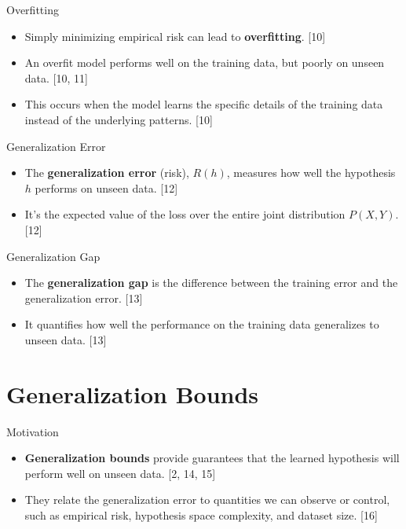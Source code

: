 \documentclass[
  ignorenonframetext,
]{beamer}
\providecommand{\tightlist}{%
  \setlength{\itemsep}{0pt}\setlength{\parskip}{0pt}}\usepackage{longtable,booktabs,array}
\begin{document}
\begin{frame}{Overfitting}
\label{overfitting}
\begin{itemize}
\tightlist
\item
  Simply minimizing empirical risk can lead to \textbf{overfitting}.
  {[}10{]}
\item
  An overfit model performs well on the training data, but poorly on
  unseen data. {[}10, 11{]}
\item
  This occurs when the model learns the specific details of the training
  data instead of the underlying patterns. {[}10{]}
\end{itemize}
\end{frame}

\begin{frame}{Generalization Error}
\label{generalization-error}
\begin{itemize}
\tightlist
\item
  The \textbf{generalization error} (risk), \(R(h)\), measures how well
  the hypothesis \(h\) performs on unseen data. {[}12{]}
\item
  It's the expected value of the loss over the entire joint distribution
  \(P(X,Y)\). {[}12{]}
\end{itemize}
\end{frame}

\begin{frame}{Generalization Gap}
\label{generalization-gap}
\begin{itemize}
\tightlist
\item
  The \textbf{generalization gap} is the difference between the training
  error and the generalization error. {[}13{]}
\item
  It quantifies how well the performance on the training data
  generalizes to unseen data. {[}13{]}
\end{itemize}
\end{frame}

\section{Generalization Bounds}\label{generalization-bounds}

\begin{frame}{Motivation}
\label{motivation}
\begin{itemize}
\tightlist
\item
  \textbf{Generalization bounds} provide guarantees that the learned
  hypothesis will perform well on unseen data. {[}2, 14, 15{]}
\item
  They relate the generalization error to quantities we can observe or
  control, such as empirical risk, hypothesis space complexity, and
  dataset size. {[}16{]}
\end{itemize}
\end{frame}
\end{document}

